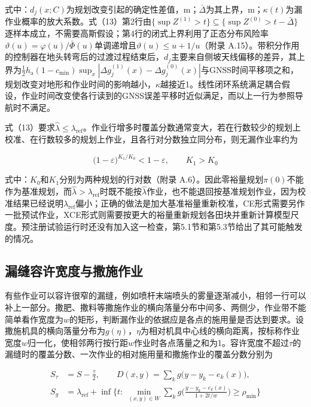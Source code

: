 \documentclass[preprint,12pt,number,sort&compress]{elsarticle}
\begin{document}
式中：\(d_j(x;C)\)为规划改变引起的确定性差值，m；\(\bar\Delta\)为其上界，m；\(\kappa(t)\)为漏作业概率的放大系数。式（13）第2行由\(\{\sup Z^{(1)}>t\}\subseteq\{\sup Z^{(0)}>t-\bar\Delta\}\)逐样本成立，不需要高斯假设；第4行的闭式上界利用了正态分布风险率\(\vartheta(u)=\varphi(u)/\bar\Phi(u)\)单调递增且\(\vartheta(u)\le u+1/u\)（附录 A.15）。带积分作用的控制器在地头转弯后的过渡过程结束后，\(d_j\)主要来自侧坡天线偏移的差异，其上界为\(\frac12h_\mathrm a(1-c_\mathrm{min})\sup_x|\Delta g^{(1)}_j(x)-\Delta g^{(0)}_j(x)|\)与GNSS时间平移项之和，规划改变对地形和作业时间的影响越小，\(\kappa\)越接近1。线性闭环系统满足耦合假设，作业时间改变使各行读到的GNSS误差平移时近似满足，而以上一行为参照导航时不满足。

式（13）要求\(\hat\lambda\le\lambda_\mathrm{ref}\)。作业行增多时覆盖分数通常变大，若在行数较少的规划上校准、在行数较多的规划上作业，且各行对分数独立同分布，则无漏作业率约为

\begin{equation}
\big(1-\varepsilon\big)^{K_1/K_0}<1-\varepsilon,\qquad K_1>K_0
\end{equation}

式中：\(K_0\)和\(K_1\)分别为两种规划的行对数（附录 A.6）。因此零裕量规划\(\pi(0)\)不能作为基准规划，而\(\hat\lambda>\lambda_\mathrm{ref}\)时既不能按\(\hat\lambda\)作业，也不能退回按基准规划作业，因为校准结果已经说明\(\lambda_\mathrm{ref}\)偏小；正确的做法是加大基准裕量重新校准，CE形式需要另作一批预试作业，XCE形式则需要按更大的裕量重新规划各田块并重新计算模型尺度。预注册试验运行时还没有加入这一检查，第5.1节和第5.3节给出了其可能触发的情况。

\subsection{漏缝容许宽度与撒施作业}

有些作业可以容许很窄的漏缝，例如喷杆末端喷头的雾量逐渐减小，相邻一行可以补上一部分。撒肥、撒料等撒施作业的横向落量分布中间多、两侧少，作业带不能简单看作宽度为\(w\)的矩形，判断漏作业的依据应是各点的施用量是否达到要求。设撒施机具的横向落量分布为\(g(\eta)\)，\(\eta\)为相对机具中心线的横向距离，按标称作业宽度\(w\)归一化，使相邻两行按行距\(w\)作业时各点落量之和为1。容许宽度不超过\(\tau\)的漏缝时的覆盖分数、一次作业的相对施用量和撒施作业的覆盖分数分别为

\begin{equation}
\begin{aligned}
S_\tau&=S-\frac{\tau}{2},\qquad D(x,y)=\sum_kg\big(y-y_k-e_k(x)\big),\\
S_g&=\lambda_\mathrm{ref}+\inf\Big\{t:\ \min_{(x,y)\in W}\sum_kg\Big(\frac{y-y_k-e_k(x)}{1+2t/w}\Big)\ge\rho_\mathrm{min}\Big\}
\end{aligned}
\end{equation}
\end{document}
